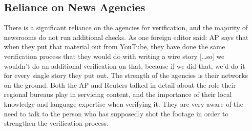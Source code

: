 \begin{enumerate}
\section{Reliance on News Agencies}
There is a significant reliance on the agencies for verification, and the majority
of newsrooms do not run additional checks. As one foreign editor said:
AP says that when they put that material out from YouTube, they
have done the same verification process that they would do with
writing a wire story […so] we wouldn't do an additional verification
on that, because if we did that, we'd do it for every single story they
put out.
The strength of the agencies is their networks on the ground. Both the AP
and Reuters talked in detail about the role their regional bureaus play in
servicing content, and the importance of their local knowledge and language
expertise when verifying it. They are very aware of the need to talk to
the person who has supposedly shot the footage in order to strengthen the
verification process.


\end{enumerate}
